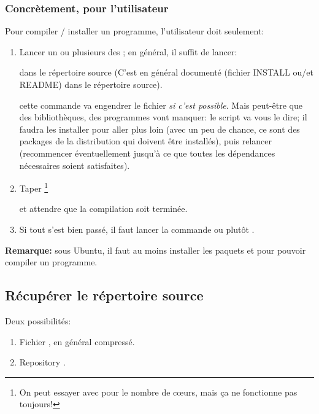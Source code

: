\begin{enumerate}
\subsubsection{Concrètement, pour l'utilisateur}
Pour compiler / installer un programme, l'utilisateur doit seulement:
\begin{enumerate}
  \item Lancer un ou plusieurs des ; en général, il
    suffit de lancer:


     dans le répertoire source (C'est en général documenté (fichier
     INSTALL ou/et README) dans le répertoire source).

    cette commande va engendrer le fichier  \emph{si
    c'est possible}. Mais peut-être que des bibliothèques, des
      programmes vont manquer: le script  va vous le
      dire; il faudra les installer pour aller plus loin (avec un peu de
      chance, ce sont des packages de la distribution qui doivent être
      installés), puis relancer
       (recommencer éventuellement jusqu'à ce que
      toutes les dépendances nécessaires soient satisfaites).
  \item Taper \footnote{On peut essayer  avec
    pour  le nombre de c{\oe}urs, mais ça ne fonctionne pas
    toujours!}

    et attendre que la compilation soit terminée.

    \item Si tout s'est bien passé, il faut lancer la commande
       ou plutôt .

\end{enumerate}
\end{enumerate}

\textbf{Remarque:} sous Ubuntu, il faut au moins installer les paquets
 et  pour pouvoir compiler un
programme. 

\subsection{Récupérer le répertoire source}

Deux possibilités:
\begin{enumerate}
\item Fichier , en général compressé.
\item \og Repository\fg{} .
\end{enumerate}

